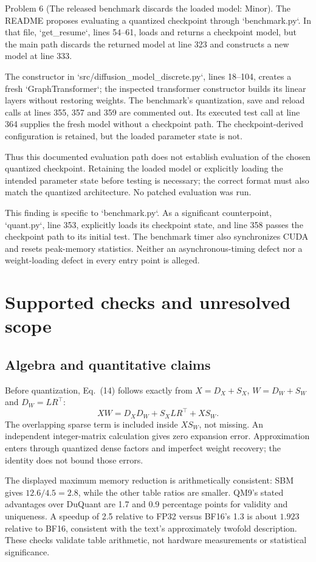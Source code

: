 \documentclass[10pt]{article}
\begin{document}
Problem 6 (The released benchmark discards the loaded model: Minor).  The README proposes evaluating a quantized checkpoint through `benchmark.py`. In that file, `get\_resume`, lines 54–61, loads and returns a checkpoint model, but the main path discards the returned model at line 323 and constructs a new model at line 333.\par
The constructor in `src/diffusion\_model\_discrete.py`, lines 18–104, creates a fresh `GraphTransformer`; the inspected transformer constructor builds its linear layers without restoring weights. The benchmark’s quantization, save and reload calls at lines 355, 357 and 359 are commented out. Its executed test call at line 364 supplies the fresh model without a checkpoint path. The checkpoint-derived configuration is retained, but the loaded parameter state is not.\par
Thus this documented evaluation path does not establish evaluation of the chosen quantized checkpoint. Retaining the loaded model or explicitly loading the intended parameter state before testing is necessary; the correct format must also match the quantized architecture. No patched evaluation was run.\par
This finding is specific to `benchmark.py`. As a significant counterpoint, `quant.py`, line 353, explicitly loads its checkpoint state, and line 358 passes the checkpoint path to its initial test. The benchmark timer also synchronizes CUDA and resets peak-memory statistics. Neither an asynchronous-timing defect nor a weight-loading defect in every entry point is alleged.\par
\section*{Supported checks and unresolved scope}
\subsection*{Algebra and quantitative claims}
Before quantization, Eq. (14) follows exactly from \(X=D_X+S_X\), \(W=D_W+S_W\) and \(D_W=LR^\top\): \[XW=D_XD_W+S_XLR^\top+XS_W.\] The overlapping sparse term is included inside \(XS_W\), not missing. An independent integer-matrix calculation gives zero expansion error. Approximation enters through quantized dense factors and imperfect weight recovery; the identity does not bound those errors.\par
The displayed maximum memory reduction is arithmetically consistent: SBM gives \(12.6/4.5=2.8\), while the other table ratios are smaller. QM9’s stated advantages over DuQuant are 1.7 and 0.9 percentage points for validity and uniqueness. A speedup of 2.5 relative to FP32 versus BF16’s 1.3 is about \(1.923\) relative to BF16, consistent with the text’s approximately twofold description. These checks validate table arithmetic, not hardware measurements or statistical significance.\par
\end{document}
